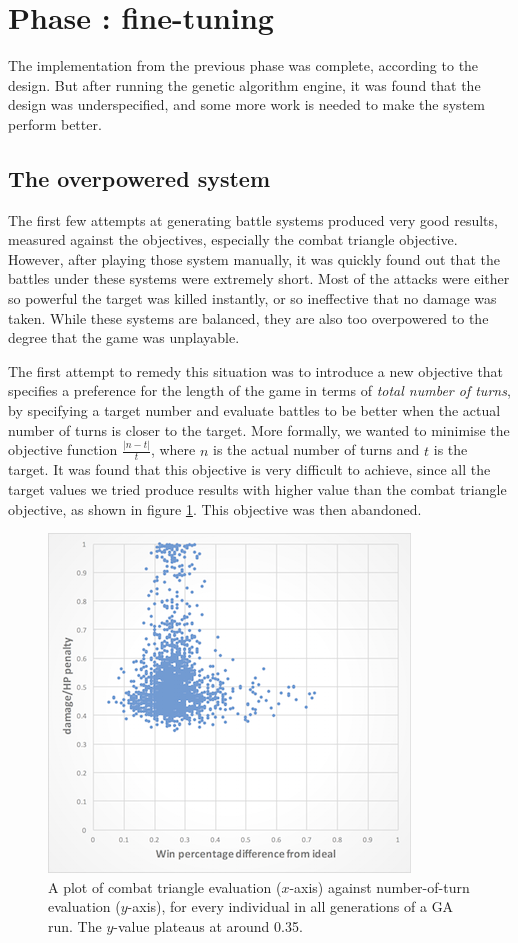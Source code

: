 \section{Phase : fine-tuning}

The implementation from the previous phase was complete, according to the design. But after running the genetic algorithm engine, it was found that the design was underspecified, and some more work is needed to make the system perform better.

\subsection{The overpowered system}

The first few attempts at generating battle systems produced very good results, measured against the objectives, especially the combat triangle objective. However, after playing those system manually, it was quickly found out that the battles under these systems were extremely short. Most of the attacks were either so powerful the target was killed instantly, or so ineffective that no damage was taken. While these systems are balanced, they are also too overpowered to the degree that the game was unplayable.

The first attempt to remedy this situation was to introduce a new objective that specifies a preference for the length of the game in terms of \textit{total number of turns}, by specifying a target number and evaluate battles to be better when the actual number of turns is closer to the target. More formally, we wanted to minimise the objective function $\frac{|n-t|}{t}$, where $n$ is the actual number of turns and $t$ is the target. It was found that this objective is very difficult to achieve, since all the target values we tried produce results with higher value than the combat triangle objective, as shown in figure \ref{fig:plot_multiobj}.
This objective was then abandoned.

\begin{figure}
	\centering
	\includegraphics[width=0.6\linewidth]{figures/plot1}
	\caption{A plot of combat triangle evaluation ($x$-axis) against number-of-turn evaluation ($y$-axis), for every individual in all generations of a GA run. The $y$-value plateaus at around 0.35.}
	\label{fig:plot_multiobj}
\end{figure}

